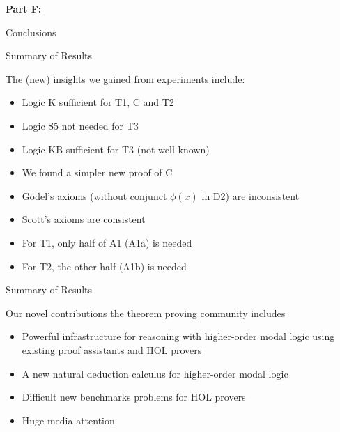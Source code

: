 
\begin{transitionframe}
\textbf{Part F:}

Conclusions
\end{transitionframe}



\begin{frame}{Summary of Results} \large

The (\alert{new}) insights we gained from experiments include:\\[.5em]
\begin{itemize}
\item Logic K sufficient for T1, C and T2 
\item Logic S5 not needed for T3
\item \alert{Logic KB sufficient for T3 (not well known)}
\item \alert{We found a simpler new proof of C}
\item \alert{G\"odel's axioms (without conjunct $\phi(x)$ in D2) are inconsistent}
\item Scott's axioms are consistent
\item For T1, only half of A1 (A1a) is needed 
\item For T2, the other half (A1b) is needed
\end{itemize}
\end{frame}


\begin{frame}{Summary of Results} \large

Our novel contributions the  theorem proving community includes \\[.5em]
\begin{itemize}
\item Powerful infrastructure for reasoning with higher-order modal logic using existing proof assistants and HOL provers
\item A new natural deduction calculus for higher-order modal logic
\item Difficult new benchmarks problems for HOL provers
\item Huge media attention
\end{itemize}
\end{frame}

